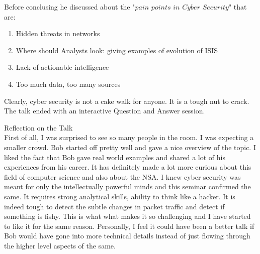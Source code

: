 \documentclass{article}
\begin{document}
Before conclusing he discussed about the "$pain$ $points$ $in$ $Cyber$ $Security$" that are:
\begin{enumerate}
\item Hidden threats in networks
\item Where should Analysts look: giving examples of evolution of ISIS
\item Lack of actionable intelligence
\item Too much data, too many sources
\end{enumerate}

Clearly, cyber security is not a cake walk for anyone. It is a tough nut to crack. The talk ended with an interactive Question and Answer session.

\maketitle
Reflection on the Talk\\
First of all, I was surprised to see so many people in the room. I was expecting a smaller crowd. Bob started off pretty well and gave a nice overview of the topic. I liked the fact that Bob gave real world examples and shared a lot of his experiences from his career. It has definitely made a lot more curious about this field of computer science and also about the NSA. I knew cyber security was meant for only the intellectually powerful minds and this seminar confirmed the same. It requires strong analytical skills, ability to think like a hacker. It is indeed tough to detect the subtle changes in packet traffic and detect if something is fishy. This is what what makes it so challenging and I have started to like it for the same reason. Personally, I feel it could have been a better talk if Bob would have gone into more technical details instead of just flowing through the higher level aspects of the same.
	


	
\end{document}
